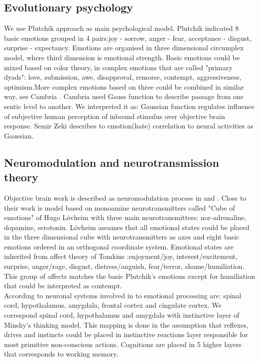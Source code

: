 \subsection{Evolutionary psychology}

We use Plutchik approach\cite{natureofemotions} as main psychological model. Plutchik indicated 8 basic emotions grouped in 4 pairs:joy - sorrow, anger - fear, acceptance - disgust, surprise - expectancy.
Emotions are organised in three dimensional circumplex model, where third dimension is emotional strength. Basic emotions could be mixed based on color theory, in complex emotions that are called "primary dyads": love, submission, awe, disapproval, remorse, contempt, aggressiveness, optimism.More complex emotions based on three could be combined in similar way, see Cambria \cite{senticcomputing}. Cambria \cite{hourglass} used Gauss function to describe passage from one sentic level to another. We interpreted it as: Gaussian function regulates influence of subjective human perception of inbound stimulus over objective brain response. Semir Zeki\cite{neuralcorrelatesofhate} describes to emotion(hate) correlation to neural activities as Gaussian.

\subsection{Neuromodulation and neurotransmission theory}

Objective brain work is described as neuromodulation process in \cite{neuromodulatory} and \cite{emotionsbraintorobot}.
Close to their work is model based on monoamine neurotransmitters called "Cube of emotions" of Hugo L\"{o}vheim\cite{cubeofemotions} with three main neurotransmitters: nor-adrenaline, dopamine, serotonin. L\"{o}vheim assumes that all emotional states could be placed in the three dimensional cube with neurotransmitters as axes and eight basic emotions ordered in an orthogonal coordinate system. Emotional states are inherited from affect theory of Tomkins \cite{tomkins1, tomkins2, tomkins3}:enjoyment/joy, interest/excitement, surprise, anger/rage, disgust, distress/anguish, fear/terror, shame/humiliation. This group of affects matches the basic Plutchik's emotions except for humiliation that could be interpreted as contempt.\\
According to \cite{emotionsbraintorobot} neuronal systems involved in to emotional processing are: spinal cord, hypothalamus, amygdala, frontal cortex and cingulate cortex. We correspond spinal cord, hypothalamus and amygdala with instinctive layer of Minsky's thinking model. This mapping is done in the assumption that reflexes, drives and instincts could be placed in instinctive reactions layer responsible for most primitive non-conscious actions. Cognitions are placed in 5 higher layers that corresponds to working memory.

